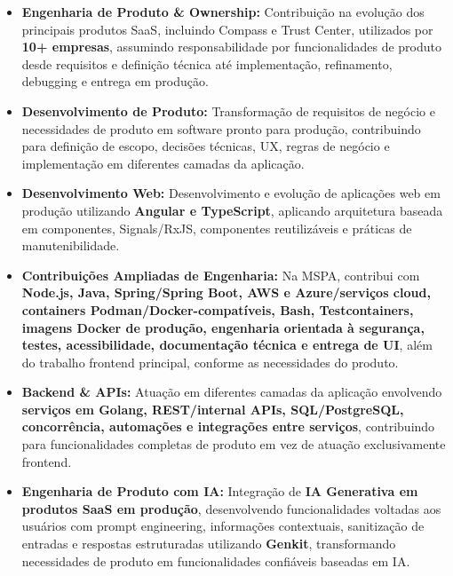 \documentclass[10pt,a4paper]{article}
\begin{document}
\begin{itemize}

    \item
    \textbf{Engenharia de Produto \& Ownership:}
    Contribuição na evolução dos principais produtos SaaS, incluindo
    Compass e Trust Center, utilizados por \textbf{10+ empresas},
    assumindo responsabilidade por funcionalidades de produto desde
    requisitos e definição técnica até implementação, refinamento,
    debugging e entrega em produção.

    \item
    \textbf{Desenvolvimento de Produto:}
    Transformação de requisitos de negócio e necessidades de produto
    em software pronto para produção, contribuindo para definição de
    escopo, decisões técnicas, UX, regras de negócio e implementação
    em diferentes camadas da aplicação.

    \item
    \textbf{Desenvolvimento Web:}
    Desenvolvimento e evolução de aplicações web em produção utilizando
    \textbf{Angular e TypeScript}, aplicando arquitetura baseada em
    componentes, Signals/RxJS, componentes reutilizáveis e práticas
    de manutenibilidade.

    \item
    \textbf{Contribuições Ampliadas de Engenharia:}
    Na MSPA, contribui com \textbf{Node.js, Java, Spring/Spring Boot,
    AWS e Azure/serviços cloud, containers Podman/Docker-compatíveis,
    Bash, Testcontainers, imagens Docker de produção, engenharia orientada à segurança,
    testes, acessibilidade, documentação técnica e entrega de UI},
    além do trabalho frontend principal, conforme as necessidades do produto.

    \item
    \textbf{Backend \& APIs:}
    Atuação em diferentes camadas da aplicação envolvendo
    \textbf{serviços em Golang, REST/internal APIs, SQL/PostgreSQL,
    concorrência, automações e integrações entre serviços},
    contribuindo para funcionalidades completas de produto em vez de
    atuação exclusivamente frontend.

    \item
    \textbf{Engenharia de Produto com IA:}
    Integração de \textbf{IA Generativa em produtos SaaS em produção},
    desenvolvendo funcionalidades voltadas aos usuários com
    prompt engineering, informações contextuais, sanitização de
    entradas e respostas estruturadas utilizando \textbf{Genkit},
    transformando necessidades de produto em funcionalidades
    confiáveis baseadas em IA.


\end{itemize}
\end{document}
